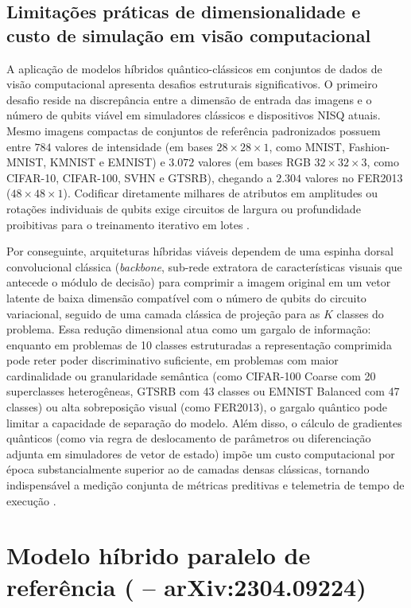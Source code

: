 \documentclass[
    12pt,
    openright,
    oneside,
    a4paper,
    english,
    brazil
]{abntex2}
\begin{document}
\subsection{Limitações práticas de dimensionalidade e custo de simulação em visão computacional}

A aplicação de modelos híbridos quântico-clássicos em conjuntos de dados de visão computacional apresenta desafios estruturais significativos. O primeiro desafio reside na discrepância entre a dimensão de entrada das imagens e o número de qubits viável em simuladores clássicos e dispositivos NISQ atuais. Mesmo imagens compactas de conjuntos de referência padronizados possuem entre \(784\) valores de intensidade (em bases \(28 \times 28 \times 1\), como MNIST, Fashion-MNIST, KMNIST e EMNIST) e \(3.072\) valores (em bases RGB \(32 \times 32 \times 3\), como CIFAR-10, CIFAR-100, SVHN e GTSRB), chegando a \(2.304\) valores no FER2013 (\(48 \times 48 \times 1\)). Codificar diretamente milhares de atributos em amplitudes ou rotações individuais de qubits exige circuitos de largura ou profundidade proibitivas para o treinamento iterativo em lotes \cite{okada2025measurementlimits}.

Por conseguinte, arquiteturas híbridas viáveis dependem de uma espinha dorsal convolucional clássica (\textit{backbone}, sub-rede extratora de características visuais que antecede o módulo de decisão) \cite{LeCun2015,he2016resnet} para comprimir a imagem original em um vetor latente de baixa dimensão compatível com o número de qubits do circuito variacional, seguido de uma camada clássica de projeção para as \(K\) classes do problema. Essa redução dimensional atua como um gargalo de informação: enquanto em problemas de 10 classes estruturadas a representação comprimida pode reter poder discriminativo suficiente, em problemas com maior cardinalidade ou granularidade semântica (como CIFAR-100 Coarse com 20 superclasses heterogêneas, GTSRB com 43 classes ou EMNIST Balanced com 47 classes) ou alta sobreposição visual (como FER2013), o gargalo quântico pode limitar a capacidade de separação do modelo. Além disso, o cálculo de gradientes quânticos (como via regra de deslocamento de parâmetros ou diferenciação adjunta em simuladores de vetor de estado) impõe um custo computacional por época substancialmente superior ao de camadas densas clássicas, tornando indispensável a medição conjunta de métricas preditivas e telemetria de tempo de execução \cite{bergholm2018pennylane,faj2023warpspeed,chen2024quantumhpcworkflow}.

\section{Modelo híbrido paralelo de referência (\texorpdfstring{}{Senokosov et al. (2024)} -- arXiv:2304.09224)}
\label{sec:modelo_referencia_senokosov}
\end{document}
